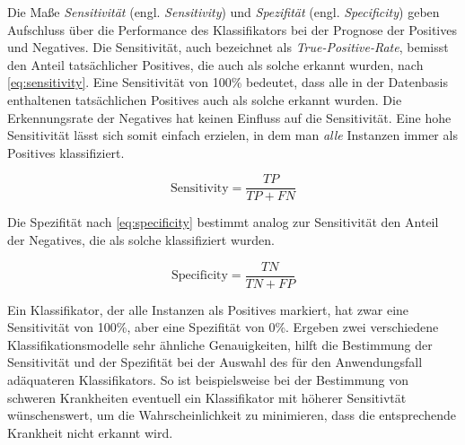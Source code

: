 Die Maße \emph{Sensitivität} (engl. \emph{Sensitivity}) und  \emph{Spezifität} (engl. \emph{Specificity}) geben Aufschluss über die Performance des Klassifikators bei der Prognose der Positives und Negatives. Die Sensitivität, auch bezeichnet als \emph{True-Positive-Rate}, bemisst den Anteil tatsächlicher Positives, die auch als solche erkannt wurden, nach \autoref{eq:sensitivity}. Eine Sensitivität von 100\% bedeutet, dass alle in der Datenbasis enthaltenen tatsächlichen Positives auch als solche erkannt  wurden. Die Erkennungsrate der Negatives hat keinen Einfluss auf die Sensitivität. Eine hohe Sensitivität lässt sich somit \glqq einfach\grqq{} erzielen, in dem man \emph{alle} Instanzen immer als Positives klassifiziert.\cite[S. 222]{machine_kubat}

\begin{equation}
\text{Sensitivity} = \frac{TP}{TP+FN}
\label{eq:sensitivity}
\end{equation}

Die Spezifität nach \autoref{eq:specificity} bestimmt analog zur Sensitivität den Anteil der Negatives, die als solche klassifiziert wurden. 

\begin{equation}
\text{Specificity} = \frac{TN}{TN+FP}
\label{eq:specificity}
\end{equation}

Ein Klassifikator, der alle Instanzen als Positives markiert, hat zwar eine Sensitivität von 100\%, aber eine Spezifität von 0\%. Ergeben zwei verschiedene Klassifikationsmodelle sehr ähnliche Genauigkeiten, hilft die Bestimmung der Sensitivität und der Spezifität bei der Auswahl des für den Anwendungsfall adäquateren Klassifikators. So ist beispielsweise bei der Bestimmung von schweren Krankheiten eventuell ein Klassifikator mit höherer Sensitivtät wünschenswert, um die Wahrscheinlichkeit zu minimieren, dass die entsprechende Krankheit nicht erkannt wird.\cite{sens-and_spec}  \cite[S. 222]{machine_kubat}

